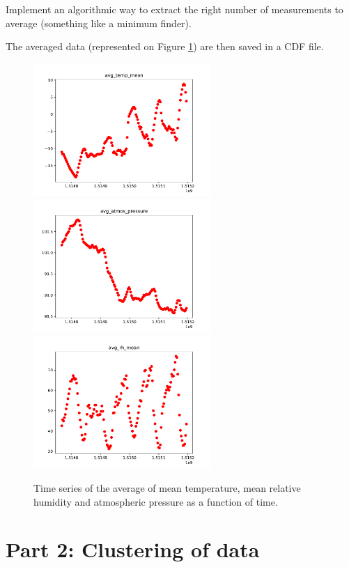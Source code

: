 \documentclass[11pt]{amsart}
\begin{document}
{\tgf Implement an algorithmic way to extract the right number of measurements to average (something like a minimum finder).}

The averaged data (represented on Figure \ref{}) are then saved in a CDF file.
\begin{figure}
    \includegraphics[width=0.6\textwidth]{../plots/avg_temp_mean.pdf}
    \includegraphics[width=0.6\textwidth]{../plots/avg_atmos_pressure.pdf}
    \includegraphics[width=0.6\textwidth]{../plots/avg_rh_mean.pdf}
    \caption{Time series of the average of mean temperature, mean relative humidity and atmospheric pressure as a function of time.}
\end{figure}

\section{Part 2: Clustering of data}
\end{document}
